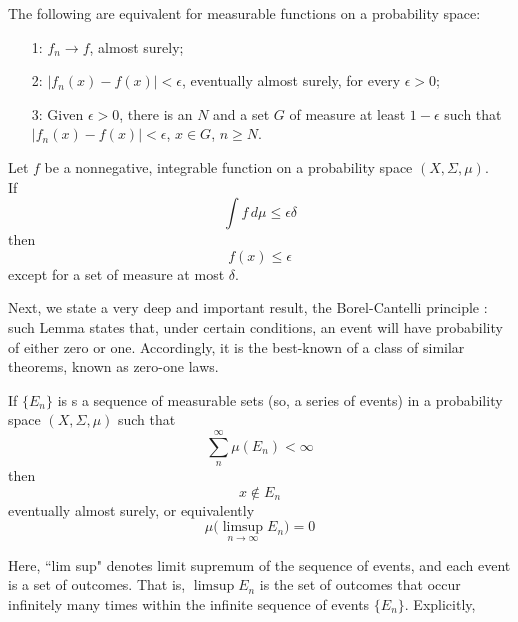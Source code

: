 \begin{lemma}
    The following are equivalent for measurable functions on a probability space:
    \begin{itemize}
        \item[1:] $f_n \rightarrow f$, almost surely;
        \item[2:] $|f_n(x) - f(x)| < \epsilon$, eventually almost surely, for every $\epsilon>0$;
        \item[3:] Given $\epsilon>0$, there is an $N$ and a set $G$ of measure at least $1 - \epsilon$ such that $|f_n(x) - f(x)| < \epsilon$, $x \in G$, $n \geq N$.
    \end{itemize}
\end{lemma}
\begin{lemma}
\label{lemma:markov_ineq}
    Let $f$ be a nonnegative, integrable function on a probability space $(X, \Sigma, \mu)$. 
    \\If 
    \begin{equation*}
        \int f \, d \mu \leq \epsilon \delta
    \end{equation*}
    then 
    \begin{equation*}
        f(x) \leq \epsilon
    \end{equation*}
    except for a set of measure at most $\delta$. 
\end{lemma}
Next, we state a very deep and important result, the Borel-Cantelli principle \cite{Borel_cantelli}: such Lemma states that, under certain conditions, an event will have probability of either zero or one. Accordingly, it is the best-known of a class of similar theorems, known as zero-one laws.
\begin{lemma}
\label{lemma:borel_cantelly}
    If $\{E_n \}$ is s a sequence of measurable sets (so, a series of events) in a probability space $(X, \Sigma, \mu)$ such that
    \begin{equation*}
        \sum_n^{\infty} \mu(E_n) < \infty
    \end{equation*}
    then 
    \begin{equation*}
        x \notin E_n 
    \end{equation*}
    eventually almost surely, or equivalently 
    \begin{equation*}
        \mu \big( \limsup_{n \rightarrow \infty} E_n    \big) = 0
    \end{equation*}
\end{lemma}
Here, ``lim sup" denotes limit supremum of the sequence of events, and each event is a set of outcomes. That is, $\limsup E_n$ is the set of outcomes that occur infinitely many times within the infinite sequence of events $\{ E_n \}$. Explicitly,
